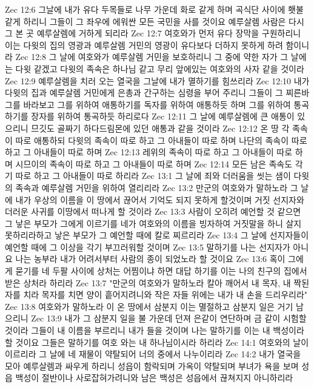 Zec 12:6  그날에 내가 유다 두목들로 나무 가운데 화로 같게 하며 곡식단 사이에 횃불 같게 하리니 그들이 그 좌우에 에워싼 모든 국민을 사를 것이요 예루살렘 사람은 다시 그 본 곳 예루살렘에 거하게 되리라
Zec 12:7  여호와가 먼저 유다 장막을 구원하리니 이는 다윗의 집의 영광과 예루살렘 거민의 영광이 유다보다 더하지 못하게 하려 함이니라
Zec 12:8  그 날에 여호와가 예루살렘 거민을 보호하리니 그 중에 약한 자가 그 날에는 다윗 같겠고 다윗의 족속은 하나님 같고 무리 앞에있는 여호와의 사자 같을 것이라
Zec 12:9  예루살렘을 치러 오는 열국을 그날에 내가 멸하기를 힘쓰리라
Zec 12:10  내가 다윗의 집과 예루살렘 거민에게 은총과 간구하는 심령을 부어 주리니 그들이 그 찌른바 그를 바라보고 그를 위하여 애통하기를 독자를 위하여 애통하듯 하며 그를 위하여 통곡하기를 장자를 위하여 통곡하듯 하리로다
Zec 12:11  그 날에 예루살렘에 큰 애통이 있으리니 므깃도 골짜기 하다드림몬에 있던 애통과 같을 것이라
Zec 12:12  온 땅 각 족속이 따로 애통하되 다윗의 족속이 따로 하고 그 아내들이 따로 하며 나단의 족속이 따로 하고 그 아내들이 따로 하며
Zec 12:13  레위의 족속이 따로 하고 그 아내들이 따로 하며 시므이의 족속이 따로 하고 그 아내들이 따로 하며
Zec 12:14  모든 남은 족속도 각기 따로 하고 그 아내들이 따로 하리라
Zec 13:1  그 날에 죄와 더러움을 씻는 샘이 다윗의 족속과 예루살렘 거민을 위하여 열리리라
Zec 13:2  만군의 여호와가 말하노라 그 날에 내가 우상의 이름을 이 땅에서 끊어서 기억도 되지 못하게 할것이며 거짓 선지자와 더러운 사귀를 이땅에서 떠나게 할 것이라
Zec 13:3  사람이 오히려 예언할 것 같으면 그 낳은 부모가 그에게 이르기를 네가 여호와의 이름을 빙자하여 거짓말을 하니 살지 못하리라하고 낳은 부모가 그 예언할 때에 칼로 찌르리라
Zec 13:4  그 날에 선지자들이 예언할 때에 그 이상을 각기 부끄러워할 것이며
Zec 13:5  말하기를 나는 선지자가 아니요 나는 농부라 내가 어려서부터 사람의 종이 되었노라 할 것이요
Zec 13:6  혹이 그에게 묻기를 네 두팔 사이에 상처는 어찜이냐 하면 대답 하기를 이는 나의 친구의 집에서 받은 상처라 하리라
Zec 13:7  "만군의 여호와가 말하노라 칼아 깨어서 내 목자, 내 짝된 자를 치라 목자를 치면 양이 흩어지려니와 작은 자들 위에는 내가 내 손을 드리우리라"
Zec 13:8  여호와가 말하노라 이 온 땅에서 삼분지 이는 멸절하고 삼분지 일은 거기 남으리니
Zec 13:9  내가 그 삼분지 일을 불 가운데 던져 은같이 연단하며 금 같이 시험할 것이라 그들이 내 이름을 부르리니 내가 들을 것이며 나는 말하기를 이는 내 백성이라 할 것이요 그들은 말하기를 여호 와는 내 하나님이시라 하리라
Zec 14:1  여호와의 날이 이르리라 그 날에 네 재물이 약탈되어 너의 중에서 나누이리라
Zec 14:2  내가 열국을 모아 예루살렘과 싸우게 하리니 성읍이 함락되며 가옥이 약탈되며 부녀가 욕을 보며 성읍 백성이 절반이나 사로잡혀가려니와 남은 백성은 성읍에서 끊쳐지지 아니하리라
